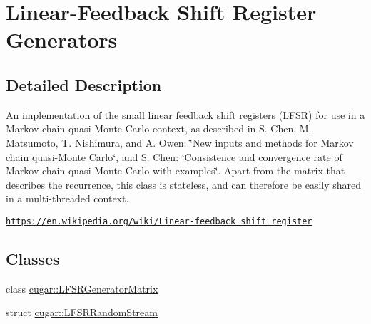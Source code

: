 \hypertarget{group___l_f_s_r_module}{}\section{Linear-\/\+Feedback Shift Register Generators}
\label{group___l_f_s_r_module}


\subsection{Detailed Description}
An implementation of the small linear feedback shift registers (L\+F\+SR) for use in a Markov chain quasi-\/\+Monte Carlo context, as described in S. Chen, M. Matsumoto, T. Nishimura, and A. Owen\+: \char`\"{}\+New inputs and methods for Markov
 chain quasi-\/\+Monte Carlo\char`\"{}, and S. Chen\+: \char`\"{}\+Consistence and convergence rate of
 Markov chain quasi-\/\+Monte Carlo with examples\char`\"{}. Apart from the matrix that describes the recurrence, this class is stateless, and can therefore be easily shared in a multi-\/threaded context.

\href{https://en.wikipedia.org/wiki/Linear-feedback_shift_register}{\tt https\+://en.\+wikipedia.\+org/wiki/\+Linear-\/feedback\+\_\+shift\+\_\+register} \subsection*{Classes}
\begin{DoxyCompactItemize}
\item 
class \hyperlink{classcugar_1_1_l_f_s_r_generator_matrix}{cugar\+::\+L\+F\+S\+R\+Generator\+Matrix}
\item 
struct \hyperlink{structcugar_1_1_l_f_s_r_random_stream}{cugar\+::\+L\+F\+S\+R\+Random\+Stream}
\end{DoxyCompactItemize}
